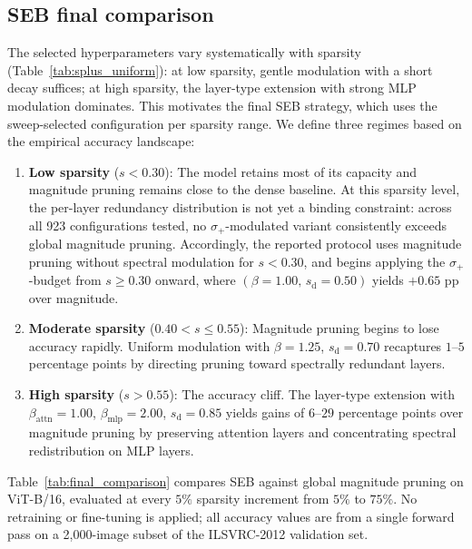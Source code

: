\documentclass[11pt]{article}
\theoremstyle{plain}
\theoremstyle{definition}
\theoremstyle{remark}
\newcommand{\1}{\mathbf{1}}
\begin{document}
\subsection{SEB final comparison}
\label{subsec:final_comparison}

The selected hyperparameters vary systematically with sparsity (Table~\ref{tab:splus_uniform}): at low sparsity, gentle modulation with a short decay suffices; at high sparsity, the layer-type extension with strong MLP modulation dominates.  This motivates the final SEB strategy, which uses the sweep-selected configuration per sparsity range.  We define three regimes based on the empirical accuracy landscape:

\begin{enumerate}[leftmargin=2em]
\item \textbf{Low sparsity} (\(s < 0.30\)):  The model retains most of its capacity and magnitude pruning remains close to the dense baseline.  At this sparsity level, the per-layer redundancy distribution is not yet a binding constraint: across all 923 configurations tested, no \(\sigma_+\)-modulated variant consistently exceeds global magnitude pruning.  Accordingly, the reported protocol uses magnitude pruning without spectral modulation for \(s < 0.30\), and begins applying the \(\sigma_+\)-budget from \(s \ge 0.30\) onward, where \((\beta=1.00,\, s_{\mathrm{d}}=0.50)\) yields \(+0.65\) pp over magnitude.

\item \textbf{Moderate sparsity} (\(0.40 < s \le 0.55\)):  Magnitude pruning begins to lose accuracy rapidly.  Uniform modulation with \(\beta=1.25\), \(s_{\mathrm{d}}=0.70\) recaptures \(1\)--\(5\) percentage points by directing pruning toward spectrally redundant layers.

\item \textbf{High sparsity} (\(s > 0.55\)):  The accuracy cliff.  The layer-type extension with \(\beta_{\mathrm{attn}}=1.00\), \(\beta_{\mathrm{mlp}}=2.00\), \(s_{\mathrm{d}}=0.85\) yields gains of \(6\)--\(29\) percentage points over magnitude pruning by preserving attention layers and concentrating spectral redistribution on MLP layers.
\end{enumerate}

Table~\ref{tab:final_comparison} compares SEB against global magnitude pruning on ViT-B/16, evaluated at every \(5\%\) sparsity increment from \(5\%\) to \(75\%\).  No retraining or fine-tuning is applied; all accuracy values are from a single forward pass on a 2{,}000-image subset of the ILSVRC-2012 validation set.
\end{document}
